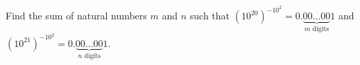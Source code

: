 Find the sum of natural numbers $m$ and $n$ such that $(10^{20})^{-10^{2}}=0.\underbrace{00\ldots00}_{m\text{ digits}}1$ and $(10^{21})^{-10^{2}}=0.\underbrace{00\ldots00}_{n\text{ digits}}1$.
